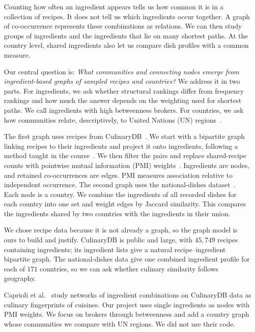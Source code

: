 Counting how often an ingredient appears tells us how common it is in a
collection of recipes. It does not tell us which ingredients occur
together. A graph of co-occurrence represents these combinations as
relations. We can then study groups of ingredients and the ingredients
that lie on many shortest paths. At the country level, shared ingredients
also let us compare dish profiles with a common measure.

Our central question is: \emph{What communities and connecting nodes emerge from ingredient-based graphs of sampled recipes and countries?}
We address it in two parts. For ingredients, we ask whether structural
rankings differ from frequency rankings and how much the answer depends
on the weighting used for shortest paths. We call ingredients with high
betweenness brokers. For countries, we ask how communities relate,
descriptively, to United Nations (UN) regions~\cite{unregions}.

The first graph uses recipes from CulinaryDB~\cite{culinarydb}. We start
with a bipartite graph linking recipes to their ingredients and project it
onto ingredients, following a method taught in the course~\cite{quercini2026}.
We then filter the pairs and replace shared-recipe counts with pointwise
mutual information (PMI) weights~\cite{church1990}. Ingredients are nodes,
and retained co-occurrences are edges. PMI measures association relative
to independent occurrence. The second graph uses the national-dishes
dataset~\cite{wunderlich2022data}. Each node is a country. We combine the
ingredients of all recorded dishes for each country into one set and
weight edges by Jaccard similarity. This compares the ingredients shared
by two countries with the ingredients in their union.

We chose recipe data because it is not already a graph, so the graph model
is ours to build and justify. CulinaryDB is public and large, with
$45{,}749$ recipes containing ingredients; its ingredient lists give a natural
recipe--ingredient bipartite graph. The national-dishes data give one combined
ingredient profile for each of $171$ countries, so we can ask whether culinary
similarity follows geography.

Caprioli et al.~\cite{caprioli2025} study networks of ingredient combinations
on CulinaryDB data as culinary fingerprints of cuisines. Our project uses
single ingredients as nodes with PMI weights. We focus on brokers through
betweenness and add a country graph whose communities we compare with UN
regions. We did not use their code.

